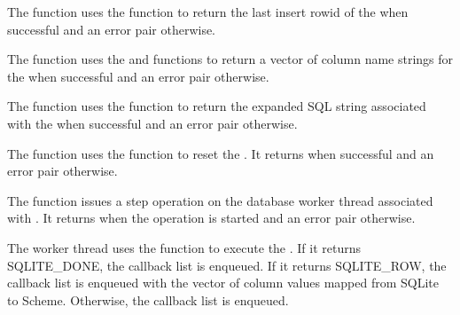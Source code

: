 The  function uses the
 function to return the last insert
rowid of the  when successful and an error pair
otherwise.

\begin{function}
\end{function}

The  function uses the
 and 
functions to return a vector of column name strings for the
 when successful and an error pair otherwise.

\begin{function}
\end{function}

The  function uses the
 function to return the expanded SQL
string associated with the  when successful and an
error pair otherwise.

\begin{function}
\end{function}

The  function uses the
 function to reset the . It
returns  when successful and an error pair otherwise.

\begin{function}
\end{function}

The  function issues a step operation on
the database worker thread associated with . It returns
 when the operation is started and an error pair otherwise.

The worker thread uses the  function to execute
the . If it returns SQLITE\_DONE, the callback list
 is enqueued. If it returns SQLITE\_ROW,
the callback list  is
enqueued with the vector of column values mapped from SQLite to
Scheme. Otherwise, the callback list  is enqueued.

